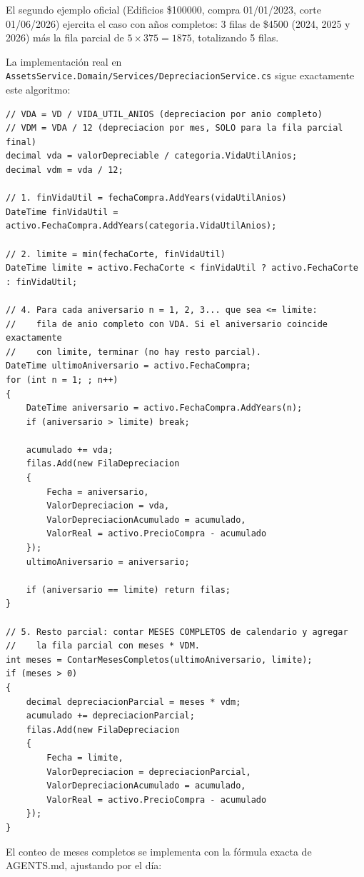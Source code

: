 \documentclass[11pt,a4paper]{article}
\begin{document}
El segundo ejemplo oficial (Edificios \$100000, compra 01/01/2023, corte
01/06/2026) ejercita el caso con años completos: 3 filas de \$4500 (2024,
2025 y 2026) más la fila parcial de $5 \times 375 = 1875$, totalizando 5
filas.

La implementación real en \texttt{AssetsService.Domain/Services/DepreciacionService.cs}
sigue exactamente este algoritmo:

\begin{lstlisting}[style=csharp, caption={AssetsService.Domain/Services/DepreciacionService.cs (fragmento)}]
// VDA = VD / VIDA_UTIL_ANIOS (depreciacion por anio completo)
// VDM = VDA / 12 (depreciacion por mes, SOLO para la fila parcial final)
decimal vda = valorDepreciable / categoria.VidaUtilAnios;
decimal vdm = vda / 12;

// 1. finVidaUtil = fechaCompra.AddYears(vidaUtilAnios)
DateTime finVidaUtil = activo.FechaCompra.AddYears(categoria.VidaUtilAnios);

// 2. limite = min(fechaCorte, finVidaUtil)
DateTime limite = activo.FechaCorte < finVidaUtil ? activo.FechaCorte : finVidaUtil;

// 4. Para cada aniversario n = 1, 2, 3... que sea <= limite:
//    fila de anio completo con VDA. Si el aniversario coincide exactamente
//    con limite, terminar (no hay resto parcial).
DateTime ultimoAniversario = activo.FechaCompra;
for (int n = 1; ; n++)
{
    DateTime aniversario = activo.FechaCompra.AddYears(n);
    if (aniversario > limite) break;

    acumulado += vda;
    filas.Add(new FilaDepreciacion
    {
        Fecha = aniversario,
        ValorDepreciacion = vda,
        ValorDepreciacionAcumulado = acumulado,
        ValorReal = activo.PrecioCompra - acumulado
    });
    ultimoAniversario = aniversario;

    if (aniversario == limite) return filas;
}

// 5. Resto parcial: contar MESES COMPLETOS de calendario y agregar
//    la fila parcial con meses * VDM.
int meses = ContarMesesCompletos(ultimoAniversario, limite);
if (meses > 0)
{
    decimal depreciacionParcial = meses * vdm;
    acumulado += depreciacionParcial;
    filas.Add(new FilaDepreciacion
    {
        Fecha = limite,
        ValorDepreciacion = depreciacionParcial,
        ValorDepreciacionAcumulado = acumulado,
        ValorReal = activo.PrecioCompra - acumulado
    });
}
\end{lstlisting}

El conteo de meses completos se implementa con la fórmula exacta de
AGENTS.md, ajustando por el día:
\end{document}
